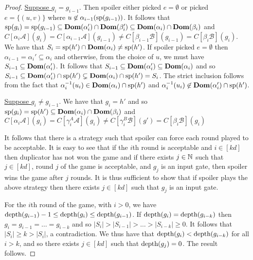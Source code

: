 \documentclass[../main/thesis.tex]{subfiles}
\begin{document}
\begin{proof}
  \underline{Suppose $g_i = g_{i-1}$}. Then spoiler either picked $e =
  \emptyset$ or picked $e = \{(u,v)\}$ where $u \not\in
  \alpha_{i-1}(\text{sp}(g_{i-1}))$. It follows that $\text{sp}(g_i) = \text{sp}(g_{i-1})
  \subseteq \text{\textbf{Dom}}(\alpha_i') \cap \text{\textbf{Dom}}(\beta_i') \subseteq \text{\textbf{Dom}}(\alpha_i) \cap
  \text{\textbf{Dom}}(\beta_i)$ and $C[\alpha_i \mathcal{A}](g_i) = C[\alpha_{i-1}
  \mathcal{A}](g_{i-1}) \neq C[\beta_{i-1}\mathcal{B}](g_{i-1}) = C[\beta_i
  \mathcal{B}](g_i)$. We have that $S_i = \text{sp}(h') \cap \text{\textbf{Dom}}(\alpha_i) \neq
  \text{sp}(h')$. If spoiler picked $e = \emptyset$ then $\alpha_{i-1} = \alpha_i'
  \subseteq \alpha_i$ and otherwise, from the choice of $u$, we must have
  $S_{i-1} \subseteq \text{\textbf{Dom}}(\alpha_i')$. It follows that $S_{i-1} \subseteq
  \text{\textbf{Dom}}(\alpha_i') \subseteq \text{\textbf{Dom}}(\alpha_i)$ and so $S_{i-1} \subseteq
  \text{\textbf{Dom}}(\alpha_i') \cap \text{sp}(h') \subsetneq \text{\textbf{Dom}}(\alpha_i) \cap \text{sp}(h') =
  S_i$. The strict inclusion follows from the fact that $\alpha^{-1}_i(u_i) \in
  \text{\textbf{Dom}}(\alpha_i) \cap \text{sp}(h')$ and $\alpha^{-1}_i(u_i) \not\in
  \text{\textbf{Dom}}(\alpha_{i}') \cap \text{sp}(h')$.
  
  \underline{Suppose $g_i \neq g_{i-1}$}. We have that $g_i = h'$ and so
  $\text{sp}(g_i) = \text{sp}(h') \subseteq \text{\textbf{Dom}}(\alpha_i) \cap \text{\textbf{Dom}} (\beta_i)$ and
  $C[\alpha_i\mathcal{A}](g_i) = C[\gamma^A_i \mathcal{A}](g_i) \neq
  C[\gamma^{B}_i \mathcal{B}](g') = C[\beta_i\mathcal{B}](g_i)$

  It follows that there is a strategy such that spoiler can force each round
  played to be acceptable. It is easy to see that if the $i$th round is
  acceptable and $i \in [kd]$ then duplicator has not won the game and if there
  exists $j \in \mathbb{N}$ such that $j \in [k d]$, round $j$ of the game is
  acceptable, and $g_j$ is an input gate, then spoiler wins the game after $j$
  rounds. It is thus sufficient to show that if spoiler plays the above strategy
  then there exists $j \in [k d]$ such that $g_j$ is an input gate.

  For the $i$th round of the game, with $i > 0$, we have $\text{depth}(g_{i-1}) - 1
  \leq \text{depth}(g_i) \leq \text{depth}(g_{i-1})$. If $\text{depth}(g_{i}) = \text{depth}(g_{i-k})$
  then $g_{i} = g_{i-1} = \ldots = g_{i-k}$ and so $\vert S_i \vert > \vert
  S_{i-1} \vert > \ldots > \vert S_{i - k} \vert \geq 0$. It follows that $\vert
  S_i \vert \geq k > \vert S_i \vert$, a contradiction. We thus have that
  $\text{depth}(g_i) < \text{depth}(g_{i-k})$ for all $i > k$, and so there exists $j \in
  [kd]$ such that $\text{depth}(g_j) = 0$. The result follows.
\end{proof}
\end{document}
